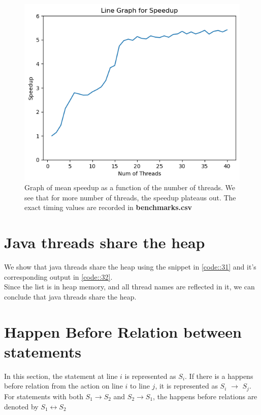 \documentclass{article}
\begin{document}
    \begin{figure}[h]
      \centering
      \includegraphics[scale=0.5]{2_amdahl/speedup_graph.png}
      \caption{Graph of mean speedup as a function of the number of threads. We see that for more number of threads, the speedup plateaus out. The exact timing values are recorded in \textbf{benchmarks.csv}}
      \label{fig::21}
    \end{figure}

  \clearpage
  \section{Java threads share the heap}
    We show that java threads share the heap using the snippet in \cref{code::31} and it's corresponding output in \cref{code::32}.\\
    Since the list is in heap memory, and all thread names are reflected in it, we can conclude that java threads share the heap.

    

    

  \clearpage
  \section{Happen Before Relation between statements}
    In this section, the statement at line $i$ is represented as $S_i$. If there is a happens before relation from the action on line $i$ to line $j$, it is represented as $S_i$ $\rightarrow$ $S_j$. For statements with both $S_1 \rightarrow S_2$ and $S_2 \rightarrow S_1$, the happens before relations are  denoted by $S_1 \longleftrightarrow S_2$
\end{document}
